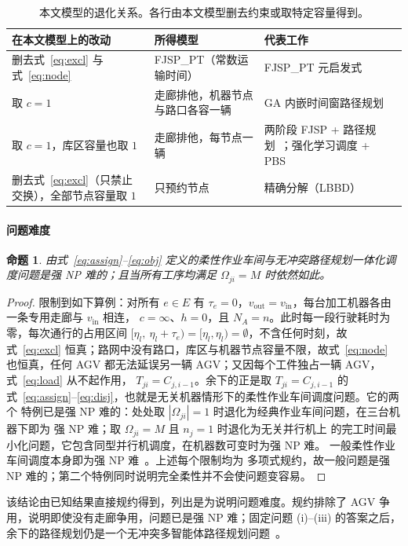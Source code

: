 \documentclass[manuscript,screen,review]{acmart}
\newtheorem{prop}{命题}
\begin{document}
\begin{table}[t]
\caption{本文模型的退化关系。各行由本文模型删去约束或取特定容量得到。}
\label{tab:degenerate}
\footnotesize
\begin{tabular}{@{}p{3.6cm}p{2.6cm}p{3.4cm}@{}}
\toprule
在本文模型上的改动 & 所得模型 & 代表工作 \\
\midrule
删去式~\eqref{eq:excl} 与式~\eqref{eq:node} & FJSP\_PT（常数运输时间） & FJSP\_PT 元启发式~\cite{meng2025cp,qin2026knowledge,jafarian2026integrated} \\
取 $c=1$ & 走廊排他，机器节点与路口各容一辆 & GA 内嵌时间窗路径规划~\cite{lyu2019approach} \\
取 $c=1$，库区容量也取 $1$ & 走廊排他，每节点一辆 & 两阶段 FJSP + 路径规划~\cite{sun2023integrated}；强化学习调度 + PBS~\cite{li2026framework} \\
删去式~\eqref{eq:excl}（只禁止交换），全部节点容量取 $1$ & 只预约节点 & 精确分解（LBBD）~\cite{vanos2026exact} \\
\bottomrule
\end{tabular}
\end{table}

\paragraph{问题难度}
\begin{prop}
\label{prop:np_hard}
由式~\eqref{eq:assign}--\eqref{eq:obj} 定义的柔性作业车间与无冲突路径规划一体化调度问题是强 NP 难的；且当所有工序均满足
$\Omega_{ji}=M$ 时依然如此。
\end{prop}

\begin{proof}
限制到如下算例：对所有 $e\in E$ 有 $\tau_e=0$，$v_{\mathrm{out}}=v_{\mathrm{in}}$，每台加工机器各由一条专用走廊与 $v_{\mathrm{in}}$ 相连，
$c=\infty$、$h=0$，且 $N_A=n$。此时每一段行驶耗时为零，每次通行的占用区间 $[\eta_l,\ \eta_l+\tau_e)=[\eta_l,\eta_l)=\emptyset$，不含任何时刻，故式~\eqref{eq:excl}
恒真；路网中没有路口，库区与机器节点容量不限，故式~\eqref{eq:node} 也恒真，任何 AGV 都无法延误另一辆 AGV；又因每个工件独占一辆 AGV，式~\eqref{eq:load} 从不起作用，
$T_{ji}=C_{j,i-1}$。余下的正是取 $T_{ji}=C_{j,i-1}$ 的
式~\eqref{eq:assign}--\eqref{eq:disj}，也就是无关机器情形下的柔性作业车间调度问题。它的两个
特例已是强 NP 难的：处处取 $|\Omega_{ji}|=1$ 时退化为经典作业车间问题，在三台机器下即为
强 NP 难；取 $\Omega_{ji}=M$ 且 $n_j=1$ 时退化为无关并行机上
的完工时间最小化问题，它包含同型并行机调度，在机器数可变时为强 NP 难。
一般柔性作业车间调度本身即为强 NP 难~\cite{dauzereperes2024fjsp}。上述每个限制均为
多项式规约，故一般问题是强 NP 难的；第二个特例同时说明完全柔性并不会使问题变容易。
\end{proof}
该结论由已知结果直接规约得到，列出是为说明问题难度。规约排除了 AGV 争用，说明即使没有走廊争用，问题已是强 NP 难；固定问题 (i)--(iii) 的答案之后，余下的路径规划仍是一个无冲突多智能体路径规划问题~\cite{gao2023mapf}。
\end{document}
